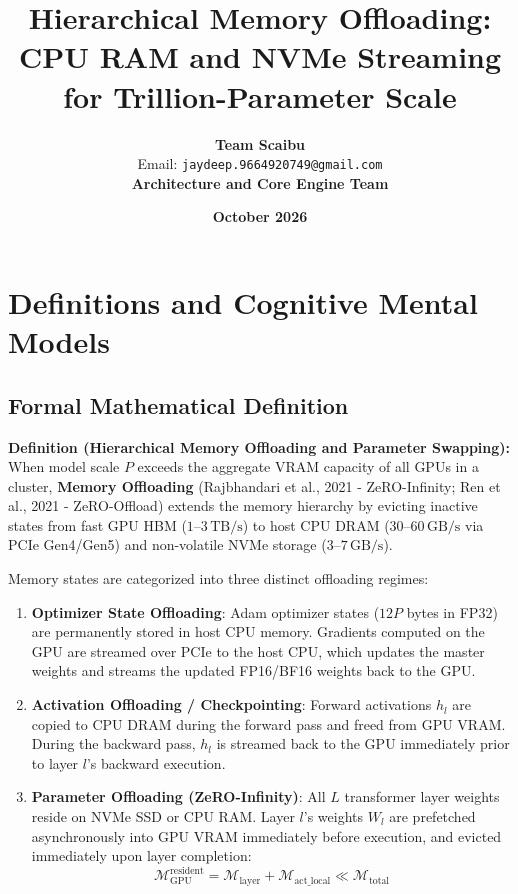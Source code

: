 \documentclass[11pt,a4paper]{article}
\title{\textbf{Hierarchical Memory Offloading: CPU RAM and NVMe Streaming for Trillion-Parameter Scale}}
\author{\textbf{Team Scaibu} \\ \small Email: \texttt{jaydeep.9664920749@gmail.com} \\ \small \textbf{Architecture and Core Engine Team}}
\date{\textbf{October 2026}}
\theoremstyle{definition}
\begin{document}
\maketitle

\section{Definitions and Cognitive Mental Models}

\subsection{Formal Mathematical Definition}
\textbf{Definition (Hierarchical Memory Offloading and Parameter Swapping):}
When model scale $P$ exceeds the aggregate VRAM capacity of all GPUs in a cluster, \textbf{Memory Offloading} (Rajbhandari et al., 2021 - ZeRO-Infinity; Ren et al., 2021 - ZeRO-Offload) extends the memory hierarchy by evicting inactive states from fast GPU HBM ($1\text{--}3\,\text{TB/s}$) to host CPU DRAM ($30\text{--}60\,\text{GB/s}$ via PCIe Gen4/Gen5) and non-volatile NVMe storage ($3\text{--}7\,\text{GB/s}$).

Memory states are categorized into three distinct offloading regimes:
\begin{enumerate}
    \item \textbf{Optimizer State Offloading}:
    Adam optimizer states ($12P$ bytes in FP32) are permanently stored in host CPU memory. Gradients computed on the GPU are streamed over PCIe to the host CPU, which updates the master weights and streams the updated FP16/BF16 weights back to the GPU.
    \item \textbf{Activation Offloading / Checkpointing}:
    Forward activations $h_l$ are copied to CPU DRAM during the forward pass and freed from GPU VRAM. During the backward pass, $h_l$ is streamed back to the GPU immediately prior to layer $l$'s backward execution.
    \item \textbf{Parameter Offloading (ZeRO-Infinity)}:
    All $L$ transformer layer weights reside on NVMe SSD or CPU RAM. Layer $l$'s weights $W_l$ are prefetched asynchronously into GPU VRAM immediately before execution, and evicted immediately upon layer completion:
    {\boldmath
    \begin{equation}
    \mathcal{M}_{\text{GPU}}^{\text{resident}} = \mathcal{M}_{\text{layer}} + \mathcal{M}_{\text{act\_local}} \ll \mathcal{M}_{\text{total}}
    \end{equation}
    }
\end{enumerate}
\end{document}
